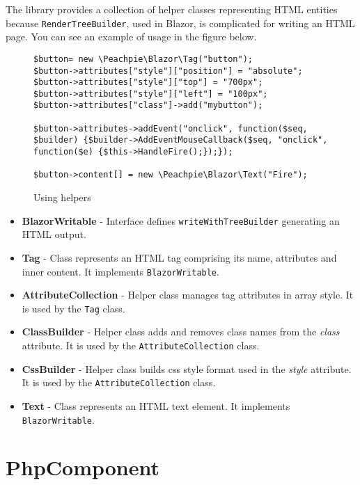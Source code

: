 The library provides a collection of helper classes representing HTML entities because \texttt{RenderTreeBuilder}, used in Blazor, is complicated for writing an HTML page. You can see an example of usage in the figure below.
\par
\begin{figure}
\begin{lstlisting}
$button= new \Peachpie\Blazor\Tag("button");
$button->attributes["style"]["position"] = "absolute";
$button->attributes["style"]["top"] = "700px";
$button->attributes["style"]["left"] = "100px";
$button->attributes["class"]->add("mybutton");        
        
$button->attributes->addEvent("onclick", function($seq, $builder) {$builder->AddEventMouseCallback($seq, "onclick", function($e) {$this->HandleFire();});});
        
$button->content[] = new \Peachpie\Blazor\Text("Fire");
\end{lstlisting}
\caption{Using helpers}
\label{img36:helpers}
\end{figure}
\par
\begin{itemize}
\item \textbf{BlazorWritable} - Interface defines \texttt{writeWithTreeBuilder} generating an HTML output. 
\item \textbf{Tag} - Class represents an HTML tag comprising its name, attributes and inner content. It implements \texttt{BlazorWritable}.  
\item \textbf{AttributeCollection} - Helper class manages tag attributes in array style. It is used by the \texttt{Tag} class.
\item \textbf{ClassBuilder} - Helper class adds and removes class names from the \textit{class} attribute. It is used by the \texttt{AttributeCollection} class.  
\item \textbf{CssBuilder} - Helper class builds css style format used in the \textit{style} attribute. It is used by the \texttt{AttributeCollection} class.  
\item \textbf{Text} - Class represents an HTML text element. It implements \texttt{BlazorWritable}.  
\end{itemize}
\par

\section{PhpComponent}


